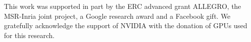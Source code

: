 \documentclass[10pt,twocolumn,letterpaper]{article}
\begin{document}
\vspace{0.2cm}
{\small {}
This work was supported in part by the ERC advanced grant ALLEGRO, the
MSR-Inria joint project, a Google research award and a Facebook gift. We
gratefully acknowledge the support of NVIDIA with the donation of GPUs used for
this research.}

{\small


}
\end{document}
